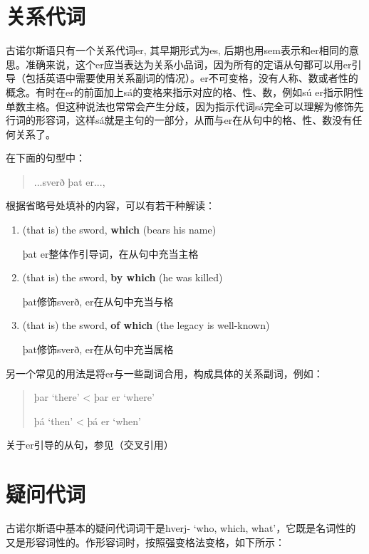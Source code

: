 \section{关系代词}\label{关系代词}

古诺尔斯语只有一个关系代词er, 其早期形式为es, 后期也用sem表示和er相同的意思。准确来说，这个er应当表达为关系小品词，因为所有的定语从句都可以用er引导（包括英语中需要使用关系副词的情况）。er不可变格，没有人称、数或者性的概念。有时在er的前面加上sá的变格来指示对应的格、性、数，例如sú er指示阴性单数主格。但这种说法也常常会产生分歧，因为指示代词sá完全可以理解为修饰先行词的形容词，这样sá就是主句的一部分，从而与er在从句中的格、性、数没有任何关系了。

在下面的句型中：
\begin{quote}
    ...sverð þat er...,
\end{quote}
根据省略号处填补的内容，可以有若干种解读：
\begin{enumerate}
    \item (that is) the sword, \textbf{which} (bears his name)‌

          þat er整体作引导词，在从句中充当主格

    \item (that is) the sword, \textbf{by which} (he was killed)‌

          þat修饰sverð, er在从句中充当与格

    \item (that is) the sword, \textbf{of which} (the legacy is well-known)‌

          þat修饰sverð, er在从句中充当属格
\end{enumerate}

另一个常见的用法是将er与一些副词合用，构成具体的关系副词，例如：

\begin{quote}
    þar `there‌' < þar er `where‌'

    þá `then‌' < þá er `when‌'
\end{quote}

关于er引导的从句，参见（交叉引用）

\section{疑问代词}\label{疑问代词}

古诺尔斯语中基本的疑问代词词干是hverj- `who, which, what‌'，它既是名词性的又是形容词性的。作形容词时，按照强变格法变格，如下所示：

